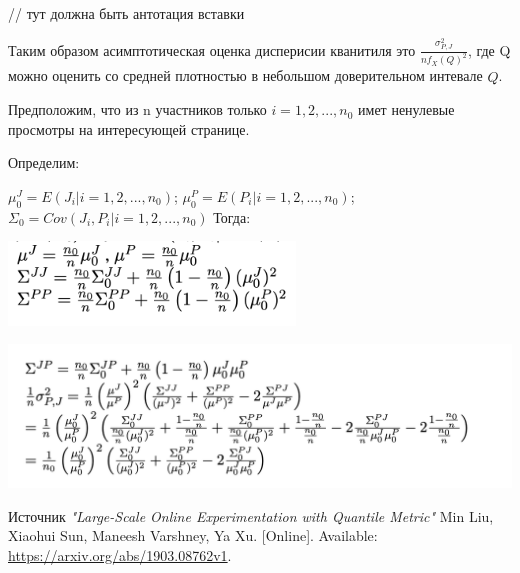 \documentclass[specialist,
               substylefile = spbu_report.rtx,
               subf,href,colorlinks=true, 12pt]{disser}
\begin{document}
\begin{enumerate}
        // тут должна быть антотация вставки 

        Таким образом асимптотическая оценка дисперисии кванитиля это $\frac{\sigma ^ 2_{P,J}}{nf_{X}(Q)^2}$,  где Q можно оценить со средней плотностью в небольшом доверительном интевале $\widehat{Q}$.

        Предположим, что из n участников только  $i = 1, 2,...,n_0$  имет ненулевые просмотры на интересующей странице.
        
        Определим: 
        
        $\mu_0^J = E(J_i|i =1,2, ... , n_0)$; $\mu_0^P = E(P_i|i =1,2, ... , n_0)$; $\Sigma_0 = Cov(J_i,P_i|i = 1,2,...,n_0)$
        Тогда:

        \includegraphics[width = 3in]{Снимок экрана 2023-10-16 в 22.09.59.png}

        \includegraphics[width = 6in]{Снимок экрана 2023-10-16 в 22.10.53.png}

        Источник \textit{"Large-Scale Online Experimentation with Quantile Metric"} Min Liu, Xiaohui Sun, Maneesh Varshney, Ya Xu. [Online]. Available: \url{https://arxiv.org/abs/1903.08762v1}.
\end{enumerate}
\newpage
\end{document}
